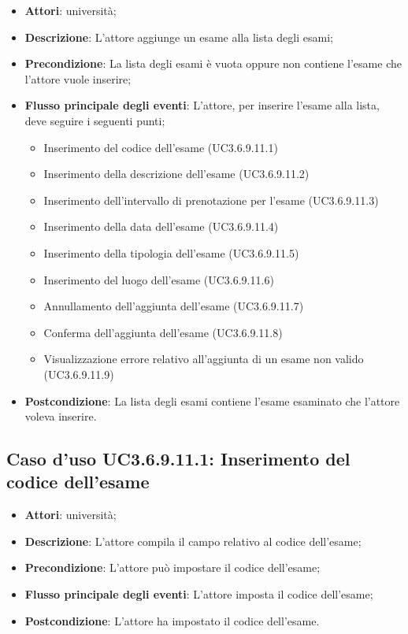 \begin{itemize}
\item \textbf{Attori}: università;
\item \textbf{Descrizione}: L'attore aggiunge un esame alla lista degli esami;

\item \textbf{Precondizione}: La lista degli esami è vuota oppure non contiene l'esame che l'attore vuole inserire;

\item \textbf{Flusso principale degli eventi}: L'attore, per inserire l'esame alla lista, deve seguire i seguenti punti;

\begin{itemize}
\item Inserimento del codice dell’esame (UC3.6.9.11.1)
\item Inserimento della descrizione dell’esame (UC3.6.9.11.2)
\item Inserimento dell’intervallo di prenotazione per l’esame (UC3.6.9.11.3)
\item Inserimento della data dell’esame (UC3.6.9.11.4)
\item Inserimento della tipologia dell’esame (UC3.6.9.11.5)
\item Inserimento del luogo dell’esame (UC3.6.9.11.6)
\item Annullamento dell’aggiunta dell’esame (UC3.6.9.11.7)
\item Conferma dell’aggiunta dell’esame (UC3.6.9.11.8)
\item Visualizzazione errore relativo all’aggiunta di un esame non valido (UC3.6.9.11.9)
\end{itemize}
\item \textbf{Postcondizione}: La lista degli esami contiene l'esame esaminato che l'attore voleva inserire.

\end{itemize}
\subsection{Caso d'uso \texorpdfstring{UC3.6.9.11.1}{UC3.6.9.11.1}: Inserimento del codice dell’esame}
\begin{itemize}
\item \textbf{Attori}: università;
\item \textbf{Descrizione}: L'attore compila il campo relativo al codice dell’esame;

\item \textbf{Precondizione}: L'attore può impostare il codice dell’esame;

\item \textbf{Flusso principale degli eventi}: L'attore imposta il codice dell’esame;

\item \textbf{Postcondizione}: L'attore ha impostato il codice dell’esame.

\end{itemize}
